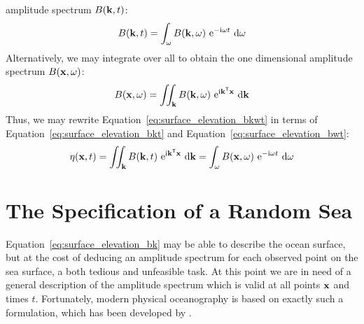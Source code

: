 amplitude spectrum $B(\mathbf{k}, t)$:
%
\begin{equation}
\label{eq:surface_elevation_bkt}
 B(\mathbf{k}, t) = \int_{\omega} B(\mathbf{k},
\omega)~\mathrm{e}^{-\mathrm{i}\omega t}~\mathrm{d}\omega
\end{equation}
%
Alternatively, we may integrate over all \wavenumbers to obtain the one dimensional
amplitude spectrum $B(\mathbf{x}, \omega)$:
%
\begin{equation}
\label{eq:surface_elevation_bwt}
 B(\mathbf{x}, \omega) = \iint_{\mathbf{k}} B(\mathbf{k},
\omega)~\mathrm{e}^{\mathrm{i}\mathbf{k}^{\mathsf{T}}\mathbf{x}}~\mathrm{d}\mathbf{k}
\end{equation}
%
Thus, we may rewrite Equation~\ref{eq:surface_elevation_bkwt} in terms of
Equation~\ref{eq:surface_elevation_bkt} and Equation~\ref{eq:surface_elevation_bwt}:
%
\begin{equation}
\label{eq:surface_elevation_bk}
  \eta(\mathbf{x}, t) = \iint_{\mathbf{k}} B(\mathbf{k},t)~\mathrm{e}^{\mathrm{i}\mathbf{k}^{\mathsf{T}}\mathbf{x}}~\mathrm{d}\mathbf{k}
  = \int_{\omega} B(\mathbf{x},\omega)~\mathrm{e}^{-\mathrm{i}\omega t}~\mathrm{d}\omega
\end{equation}
%
%
\section{The Specification of a Random Sea}
\label{sec:random_sea}
%
Equation~\ref{eq:surface_elevation_bk} may be able to describe the ocean
surface, but at the cost of deducing an amplitude spectrum for each observed
point on the sea surface, a both tedious and unfeasible task. At
this point we are in need of a general description of the amplitude spectrum
which is valid at all points $\mathbf{x}$ and times $t$.
Fortunately, modern physical oceanography is
based on exactly such a formulation, which has been developed by \citet{Neumann:1966}.

